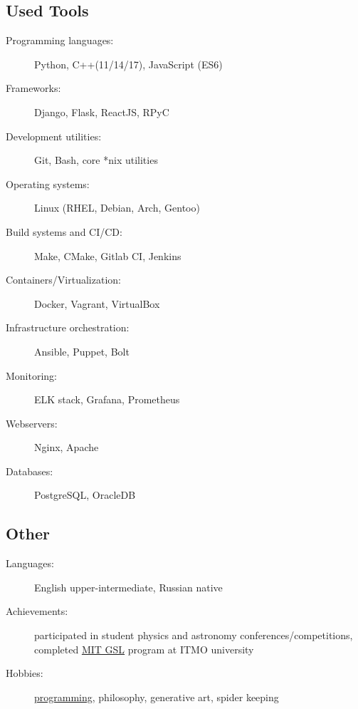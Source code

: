 \documentclass[11pt]{report}
\begin{document}
\subsection*{Used Tools}
\begin{description}
    \item[Programming languages:]
    Python, C++(11/14/17), JavaScript (ES6)
    \item[Frameworks:]
    Django, Flask, ReactJS, RPyC
    \item[Development utilities:]
    Git, Bash, core *nix utilities
    \item[Operating systems:]
    Linux (RHEL, Debian, Arch, Gentoo)
    \item[Build systems and CI/CD:]
    Make, CMake, Gitlab CI, Jenkins
    \item[Containers/Virtualization:]
    Docker, Vagrant, VirtualBox
    \item[Infrastructure orchestration:]
    Ansible, Puppet, Bolt
    \item[Monitoring:]
    ELK stack, Grafana, Prometheus
    \item[Webservers:]
    Nginx, Apache
    \item[Databases:]
    PostgreSQL, OracleDB
\end{description}

\subsection*{Other}
\begin{description}
    \item[Languages:]
    English upper-intermediate, Russian native
    \item[Achievements:]
    participated in student physics and astronomy conferences/competitions,
    completed \href{https://gsl.mit.edu/}{MIT GSL} program at ITMO university
    \item[Hobbies:]
    \href{https://github.com/unsip}{programming}, philosophy, generative art, spider keeping
\end{description}
\end{document}
